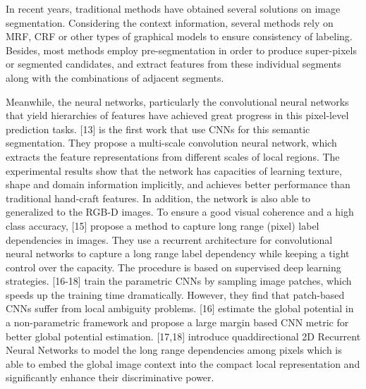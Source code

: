 \documentclass[10.5pt,compsoc]{TsT}
\newcommand{\upcite}[1]{\superscript{\textsuperscript{\cite{#1}}}}
\theoremstyle{mystyle}
\newcommand{\upcite}[1]{\textsuperscript{\cite{#1}}}
\begin{document}
{In recent years, traditional methods have obtained several solutions on image segmentation. Considering the context information, several methods rely on MRF, CRF or other types of graphical models to ensure consistency of labeling\upcite{10,11,12}. Besides, most methods employ pre-segmentation in order to produce super-pixels or segmented candidates, and extract features from these individual segments along with the combinations of adjacent segments.

Meanwhile, the neural networks, particularly the convolutional neural networks that yield hierarchies of features have achieved great progress in  this pixel-level prediction tasks. [13] is the first work that use CNNs for this semantic segmentation. They propose a multi-scale convolution neural network, which extracts the feature representations from different scales of local regions. The experimental results show that the network has capacities of learning texture, shape and domain information implicitly, and achieves better performance than traditional hand-craft features. In addition, the network is also able to generalized to the RGB-D images\upcite{14}. To ensure a good visual coherence and a high class accuracy, [15] propose a method to capture long range (pixel) label dependencies in images. They use a recurrent architecture for convolutional neural networks to capture a long range label dependency while keeping a tight control over the capacity. The procedure is based on supervised deep learning strategies. [16-18] train the parametric CNNs by sampling image patches, which speeds up the training time dramatically. However, they find that patch-based CNNs suffer from local ambiguity problems. [16] estimate the global potential in a non-parametric framework and propose a large margin based CNN metric for better global potential estimation. [17,18] introduce quaddirectional 2D Recurrent Neural Networks to model the long range dependencies among pixels which is able to embed the global image context into the compact local representation and significantly enhance their discriminative power.

}
\end{document}
